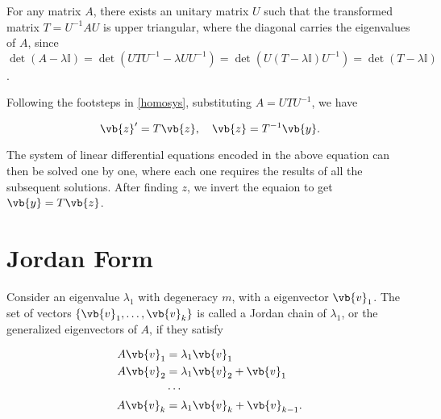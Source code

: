 \documentclass[english,a4paper,12pt]{report}
\begin{document}
For any matrix \(A\), there exists an unitary matrix \(U\) such that the transformed matrix \(T = U^{-1} AU\) is upper triangular, where the diagonal carries the eigenvalues of \(A\), since \(\det (A-\lambda \mathbb{I}) = \det (UTU^{-1} - \lambda U U^{-1}  ) = \det (U(T-\lambda \mathbb{I})U^{-1} ) = \det (T-\lambda \mathbb{I})\).  

Following the footsteps in \cref{homosys}, substituting \(A = UTU^{-1} \), we have

\begin{equation}
    \vb{z} ' = T\vb{z}, \quad \vb{z} = T^{-1} \vb{y}.
\end{equation}

The system of linear differential equations encoded in the above equation can then be solved one by one, where each one requires the results of all the subsequent solutions. After finding \(z\), we invert the equaion to get \(\vb{y}  = T\vb{z} \). 

\section{Jordan Form}

Consider an eigenvalue \(\lambda _{1} \) with degeneracy \(m\), with a eigenvector \(\vb{v} _{1} \). The set of vectors \(\left\{ \vb{v}_1, \ldots , \vb{v}_k \right\}\) is called a Jordan chain of \(\lambda _{1} \), or the generalized eigenvectors of \(A\), if they satisfy

\begin{equation}
    \begin{aligned}
        A\vb{v} _{1}&=\lambda _{1}\vb{v} _{1}\\
        A\vb{v} _{2}&=\lambda _{1}\vb{v} _{2}+\vb{v} _{1}\\
        &\cdots \\
        A\vb{v} _{k}&=\lambda _{1}\vb{v} _{k}+\vb{v} _{k-1}.           
    \end{aligned}
\end{equation}
\end{document}
